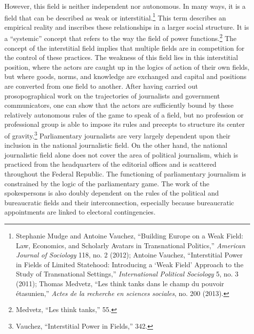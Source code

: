 \documentclass{tufte-handout}
\begin{document}
However, this field is neither independent nor autonomous. In many ways,
it is a field that can be described as weak or interstitial.\footnote{Stephanie
  Mudge and Antoine Vauchez, ``Building Europe on a Weak Field: Law,
  Economics, and Scholarly Avatars in Transnational Politics,''
  \emph{American Journal of Sociology} 118, no. 2 (2012); Antoine
  Vauchez, ``Interstitial Power in Fields of Limited Statehood:
  Introducing a `Weak Field' Approach to the Study of Transnational
  Settings,'' \emph{International Political Sociology} 5, no. 3 (2011);
  Thomas Medvetz, ``Les think tanks dans le champ du pouvoir
  étasunien,'' \emph{Actes de la recherche en sciences sociales}, no.
  200 (2013).} This term describes an empirical reality and inscribes
these relationships in a larger social structure. It is a ``systemic''
concept that refers to the way the field of power functions.\footnote{Medvetz,
  ``Les think tanks,'' 55.} The concept of the interstitial field
implies that multiple fields are in competition for the control of these
practices. The weakness of this field lies in this interstitial
position, where the actors are caught up in the logics of action of
their own fields, but where goods, norms, and knowledge are exchanged
and capital and positions are converted from one field to another. After
having carried out prosopographical work on the trajectories of
journalists and government communicators, one can show that the actors
are sufficiently bound by these relatively autonomous rules of the game
to speak of a field, but no profession or professional group is able to
impose its rules and precepts to structure its center of
gravity.\footnote{Vauchez, ``Interstitial Power in Fields,'' 342.}
Parliamentary journalists are very largely dependent upon their
inclusion in the national journalistic field. On the other hand, the
national journalistic field alone does not cover the area of political
journalism, which is practiced from the headquarters of the editorial
offices and is scattered throughout the Federal Republic. The
functioning of parliamentary journalism is constrained by the logic of
the parliamentary game. The work of the spokespersons is also doubly
dependent on the rules of the political and bureaucratic fields and
their interconnection, especially because bureaucratic appointments are
linked to electoral contingencies.
\end{document}
